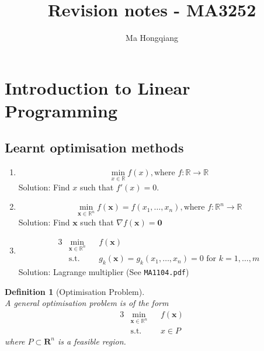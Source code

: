\documentclass[12pt]{article}
\newcommand{\st}{\mathrm{s.t.}}
\newtheorem{definition}{Definition}[section]
\theoremstyle{definition}
\begin{document}
\title{Revision notes - MA3252}
\author{Ma Hongqiang}
\maketitle
\tableofcontents

\clearpage
\section{Introduction to Linear Programming}
\subsection{Learnt optimisation methods}
\begin{enumerate}
  \item \[
\min_{x\in\mathbb{R}}f(x), \text{where } f:\mathbb{R}\to\mathbb{R}
  \]
Solution: Find $x$ such that $f'(x)=0$.
\item \[
\min_{\mathbf{x}\in \mathbb{R}^n}f(\mathbf{x})=f(x_1,\ldots, x_n),\text{where } f:\mathbb{R}^n\to\mathbb{R}
\]
Solution: Find $\mathbf{x}$ such that $\nabla f(\mathbf{x})=\mathbf{0}$
\item \begin{alignat*}{3}
&\min_{\mathbf{x}\in \mathbb{R}^n}&&f(\mathbf{x})\\
&\st &&g_k(\mathbf{x})=g_k(x_1,\ldots, x_n)=0\text{ for }k=1,\ldots, m
\end{alignat*}
Solution: Lagrange multiplier (See \texttt{MA1104.pdf})
\end{enumerate}
\begin{definition}[Optimisation Problem]
\hfill\\\normalfont A general optimisation problem is of the form
\begin{alignat*}{3}
&\min_{\mathbf{x}\in\mathbb{R}^n}&& f(\mathbf{x})\\
&\st&&x\in P
\end{alignat*}
where $P\subset\mathbf{R}^n$ is a feasible region.
\end{definition}
\end{document}

